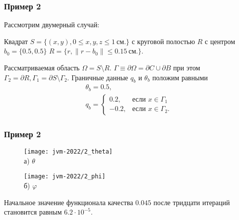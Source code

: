 \begin{frame}
    \frametitle{Пример 2}
    Рассмотрим двумерный случай:

    Квадрат $S = \{(x, y), 0 \leq x,y,z \leq 1~\text{см.}\}$ с
    круговой полостью $R$ с центром $b_0 =\{0.5, 0.5\}$
    $R = \{r, \| r - b_0 \| \leq 0.15~\text{см.} \}$.

    Рассматриваемая область $\Omega = S \setminus R$.
    $\Gamma \equiv \partial \Omega = \partial C \cup \partial B$ при этом
    $ \Gamma_2 = \partial R, \Gamma_1 = \partial S \setminus \Gamma_2$.
    Граничные данные $q_b$ и $\theta_b$ положим равными
    \begin{gather*}
        \theta_b = 0.5, \\
        q_b =
        \begin{cases}
            0.2, & \text{если } x \in \Gamma_1 \\
            -0.2, & \text{если } x \in \Gamma_2.
        \end{cases}
    \end{gather*}


\end{frame}

\begin{frame}
    \frametitle{Пример 2}
    \begin{figure}[h!t]
        \begin{minipage}[b][][b]{0.49\linewidth}
            \centering
            \texttt{[image: jvm-2022/2\_theta]}
            \\ а) $\theta$
        \end{minipage}
        \hfill
        \begin{minipage}[b][][b]{0.49\linewidth}
            \centering
            \texttt{[image: jvm-2022/2\_phi]}
            \\ б) $\varphi$
        \end{minipage}
        \label{fig:4_4:6}
    \end{figure}
    Начальное значение функционала качества $0.045$
    после тридцати итераций становится равным $6.2\cdot10^{-5}$.

\end{frame}

